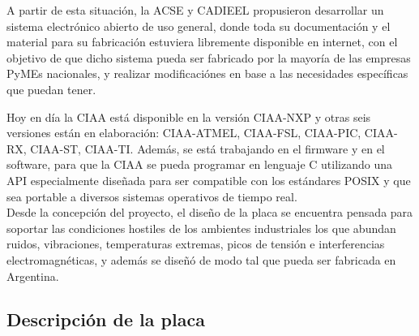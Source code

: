\documentclass[12pt,letterpaper]{article}
\begin{document}
A partir de esta situación, la ACSE y CADIEEL propusieron desarrollar un sistema electrónico abierto de uso general, donde toda su documentación y el material para su fabricación estuviera libremente disponible en internet, con el objetivo de que dicho sistema pueda ser fabricado por la mayoría de las empresas PyMEs nacionales, y realizar modificaciónes en base a las necesidades específicas que puedan tener.




Hoy en día la CIAA está disponible en la versión CIAA-NXP y otras seis versiones están en elaboración: CIAA-ATMEL, CIAA-FSL, CIAA-PIC, CIAA-RX, CIAA-ST, CIAA-TI. Además, se está trabajando en el firmware y en el software, para que la CIAA se pueda programar en lenguaje C utilizando una API especialmente diseñada para ser compatible con los estándares POSIX y que sea portable a diversos sistemas operativos de tiempo real.\\
Desde la concepción del proyecto, el diseño de la placa se encuentra pensada para soportar las condiciones hostiles de los ambientes industriales los que abundan ruidos, vibraciones, temperaturas extremas, picos de tensión e interferencias electromagnéticas, y además se diseñó de modo tal que pueda ser fabricada en Argentina\cite{origeneduciaa}.

\subsection{Descripción de la placa}
\end{document}
